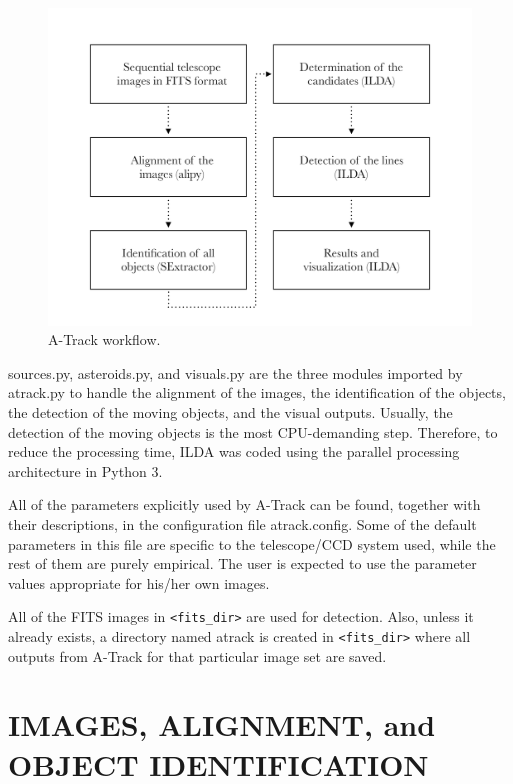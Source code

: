 \documentclass[review]{elsarticle}
\begin{document}
\begin{figure}[!h]
  \centering
  \includegraphics[width=1.0\textwidth]{figure_1_workflow}
  \caption{A-Track workflow.}
  \label{fig:workflow}
\end{figure}


sources.py, asteroids.py, and visuals.py are the three modules imported by atrack.py to handle the alignment of the images, the identification of the objects, the detection of the moving objects, and the visual outputs. Usually, the detection of the moving objects is the most CPU-demanding step. Therefore, to reduce the processing time, ILDA was coded using the parallel processing architecture in Python 3.

All of the parameters explicitly used by A-Track can be found, together with their descriptions, in the configuration file atrack.config. Some of the default parameters in this file are specific to the telescope/CCD system used, while the rest of them are purely empirical. The user is expected to use the parameter values appropriate for his/her own images.

All of the FITS images in \verb;<fits_dir>; are used for detection. Also, unless it already exists, a directory named atrack is created in \verb;<fits_dir>; where all outputs from A-Track for that particular image set are saved.

\section{IMAGES, ALIGNMENT, and OBJECT IDENTIFICATION} %
\end{document}
